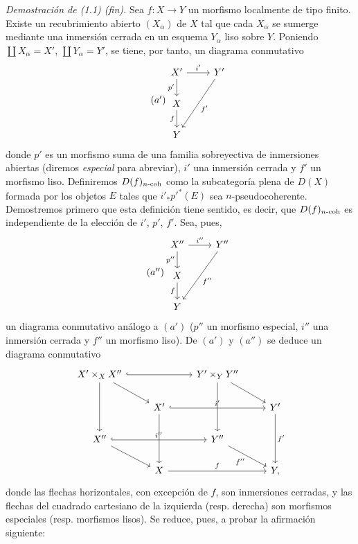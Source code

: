 \emph{Demostración de (1.1) (fin).} Sea \(f:X\to Y\) un morfismo localmente de tipo finito. Existe un recubrimiento abierto \((X_\alpha)\) de \(X\) tal que cada \(X_\alpha\) se sumerge mediante una inmersión cerrada en un esquema \(Y_\alpha\) liso sobre \(Y\). Poniendo \(\coprod X_\alpha=X'\), \(\coprod Y_\alpha=Y'\), se tiene, por tanto, un diagrama conmutativo
\begin{equation}\tag{$a'$}
\begin{tikzcd}
X' \arrow[r,"\sisi{i''}{i'}"] \arrow[d,"p'"'] & Y' \arrow[ddl,"f'"]\\
X \arrow[d,"f"']\\
Y
\end{tikzcd}
\end{equation}
donde \(p'\) es un morfismo suma de una familia sobreyectiva de inmersiones abiertas (diremos \emph{especial} para abreviar), \(i'\) una inmersión cerrada y \(f'\) un morfismo liso. Definiremos \(D(f)_{n\text{-}\mathrm{coh}}\) como la subcategoría plena de \(D(X)\) formada por los objetos \(E\) tales que \(i'_*p'^*(E)\) sea \(n\)-pseudocoherente. Demostremos primero que esta definición tiene sentido, es decir, que \(D(f)_{n\text{-}\mathrm{coh}}\) es independiente de la elección de \(i'\), \(p'\), \(f'\). Sea, pues,
\begin{equation}\tag{$a''$}
\begin{tikzcd}
X'' \arrow[r,"i''"] \arrow[d,"p''"'] & Y'' \arrow[ddl,"f''"]\\
X \arrow[d,"f"']\\
Y
\end{tikzcd}
\end{equation}
un diagrama conmutativo análogo a \((a')\) (\(p''\) un morfismo especial, \(i''\) una inmersión cerrada y \(f''\) un morfismo liso). De \((a')\) y \((a'')\) se deduce un diagrama conmutativo
\[
\begin{tikzcd}
X'\times_X X'' \arrow[rr,hook] \arrow[dr] \arrow[dd] & & Y'\times_Y Y'' \arrow[dr] \arrow[dd] & \\
& X' \arrow[rr,hook,"i'"] \arrow[dd] & & Y' \arrow[dd,"f'"]\\
X'' \arrow[rr,hook,"i''"] \arrow[dr] & & Y'' \arrow[dr,"f''"'] & \\
& X \arrow[rr,"f"] & & Y,
\end{tikzcd}
\]
donde las flechas horizontales, con excepción de \(f\), son inmersiones cerradas, y las flechas del cuadrado cartesiano de la izquierda (resp. derecha) son morfismos especiales (resp. morfismos lisos). Se reduce, pues, a probar la afirmación siguiente:

